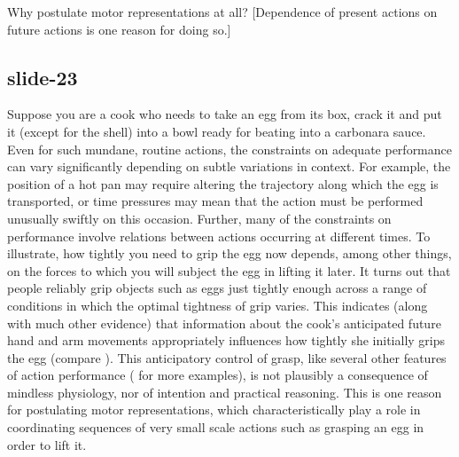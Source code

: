 \documentclass[12pt,\papersize]{extarticle}
\begin{document}
Why postulate motor representations at all? [Dependence of present actions on future actions
is one reason for doing so.]
 
\subsection{slide-23}
Suppose you are a cook who needs to take an egg from its box, crack it and put it (except for the
shell) into a bowl ready for beating into a carbonara sauce.
Even for such mundane, routine actions, the constraints on adequate performance can vary
significantly depending on subtle variations in context. For example, the position of a hot pan
may require altering the trajectory along which the egg is transported, or time pressures may mean
that the action must be performed unusually swiftly on this occasion.
Further, many of the constraints on performance involve relations between actions occurring at
different times.
To illustrate, how tightly you need to grip the egg now depends, among other things, on the forces
to which you will subject the egg in lifting it later.
It turns out that people reliably grip objects such as eggs just tightly enough across a range of
conditions in which the optimal tightness of grip varies.
This indicates (along with much other evidence) that information about the cook’s anticipated
future hand and arm movements appropriately influences how tightly she initially grips the egg
(compare \citealp{kawato:1999_internal}).
This anticipatory control of grasp,
like several other features of action performance (\citealp[see][chapter 1]{rosenbaum:2010_human} for more examples),
is not plausibly a consequence of mindless physiology, nor of intention and practical reasoning.
This is one reason for postulating motor representations, which characteristically play a role in
coordinating sequences of very small scale actions such as grasping an egg in order to lift it.
 
\end{document}
